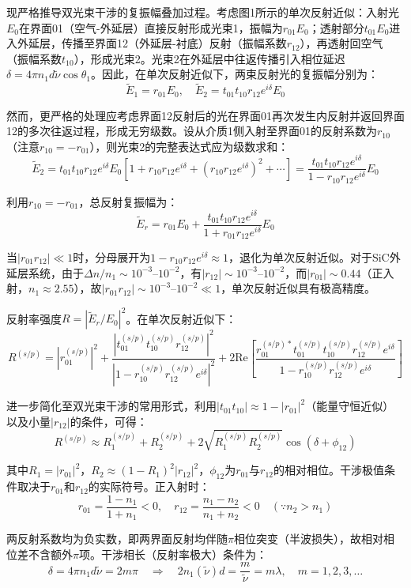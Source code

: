 \documentclass{mcmthesis}
\begin{document}
现严格推导双光束干涉的复振幅叠加过程。考虑图1所示的单次反射近似：入射光$E_0$在界面01（空气-外延层）直接反射形成光束1，振幅为$r_{01}E_0$；透射部分$t_{01}E_0$进入外延层，传播至界面12（外延层-衬底）反射（振幅系数$r_{12}$），再透射回空气（振幅系数$t_{10}$），形成光束2。光束2在外延层中往返传播引入相位延迟$\delta = 4\pi n_1 d\tilde{\nu}\cos\theta_1$。因此，在单次反射近似下，两束反射光的复振幅分别为：
$$\tilde{E}_1 = r_{01}E_0, \quad \tilde{E}_2 = t_{01}t_{10}r_{12}e^{i\delta}E_0 \tag{6}$$

然而，更严格的处理应考虑界面12反射后的光在界面01再次发生内反射并返回界面12的多次往返过程，形成无穷级数。设从介质1侧入射至界面01的反射系数为$r_{10}$（注意$r_{10} = -r_{01}$），则光束2的完整表达式应为级数求和：
$$\tilde{E}_2 = t_{01}t_{10}r_{12}e^{i\delta}E_0 \left[1 + r_{10}r_{12}e^{i\delta} + (r_{10}r_{12}e^{i\delta})^2 + \cdots\right] = \frac{t_{01}t_{10}r_{12}e^{i\delta}}{1-r_{10}r_{12}e^{i\delta}}E_0 \tag{7}$$

利用$r_{10} = -r_{01}$，总反射复振幅为：
$$\tilde{E}_r = r_{01}E_0 + \frac{t_{01}t_{10}r_{12}e^{i\delta}}{1+r_{01}r_{12}e^{i\delta}}E_0 \tag{8}$$

当$|r_{01}r_{12}| \ll 1$时，分母展开为$1-r_{10}r_{12}e^{i\delta} \approx 1$，退化为单次反射近似。对于SiC外延层系统，由于$\Delta n/n_1 \sim 10^{-3}$–$10^{-2}$，有$|r_{12}| \sim 10^{-3}$–$10^{-2}$，而$|r_{01}| \sim 0.44$（正入射，$n_1\approx 2.55$），故$|r_{01}r_{12}| \sim 10^{-3}$–$10^{-2} \ll 1$，单次反射近似具有极高精度。

反射率强度$R = |\tilde{E}_r/E_0|^2$。在单次反射近似下：
$$R^{(s/p)} = |r_{01}^{(s/p)}|^2 + \frac{|t_{01}^{(s/p)}t_{10}^{(s/p)}r_{12}^{(s/p)}|^2}{|1-r_{10}^{(s/p)}r_{12}^{(s/p)}e^{i\delta}|^2} + 2\mathrm{Re}\left[\frac{r_{01}^{(s/p)*}t_{01}^{(s/p)}t_{10}^{(s/p)}r_{12}^{(s/p)}e^{i\delta}}{1-r_{10}^{(s/p)}r_{12}^{(s/p)}e^{i\delta}}\right] \tag{9}$$

进一步简化至双光束干涉的常用形式，利用$|t_{01}t_{10}| \approx 1-|r_{01}|^2$（能量守恒近似）以及小量$|r_{12}|$的条件，可得：
$$R^{(s/p)} \approx R_1^{(s/p)} + R_2^{(s/p)} + 2\sqrt{R_1^{(s/p)}R_2^{(s/p)}}\cos(\delta + \phi_{12}) \tag{10}$$

其中$R_1 = |r_{01}|^2$，$R_2 \approx (1-R_1)^2|r_{12}|^2$，$\phi_{12}$为$r_{01}$与$r_{12}$的相对相位。干涉极值条件取决于$r_{01}$和$r_{12}$的实际符号。正入射时：
$$r_{01} = \frac{1-n_1}{1+n_1} < 0, \quad r_{12} = \frac{n_1-n_2}{n_1+n_2} < 0 \quad (\because n_2 > n_1) \tag{11}$$

两反射系数均为负实数，即两界面反射均伴随$\pi$相位突变（半波损失），故相对相位差不含额外$\pi$项。干涉相长（反射率极大）条件为：
$$\delta = 4\pi n_1 d\tilde{\nu} = 2m\pi \quad \Rightarrow \quad 2n_1(\tilde{\nu})d = \frac{m}{\tilde{\nu}} = m\lambda, \quad m=1,2,3,\ldots \tag{12}$$
\end{document}
